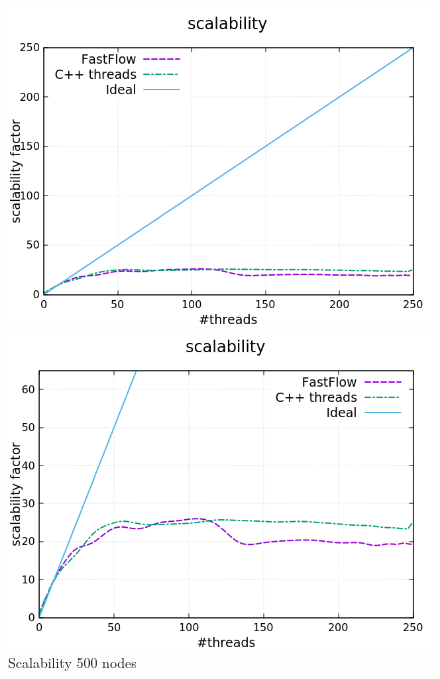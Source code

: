 \begin{figure}[H]
	\centering
	\begin{minipage}[t]{0.50\linewidth}
		\includegraphics[width=\linewidth]{benchmark/curves/scalability_standard_500_20000.png}
		\vspace{0.2em}
	\end{minipage}%
	\begin{minipage}[t]{0.50\linewidth}
		\includegraphics[width=\linewidth]{benchmark/curves/scalability_zoom_500_20000.png}
	\end{minipage}
	\caption{Scalability 500 nodes}\label{fig:scalability2000}
\end{figure}